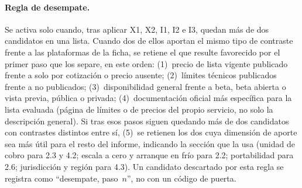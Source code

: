\documentclass[12pt, letterpaper, table, xcdraw]{inf-pucv}
\begin{document}
\FloatBarrier

\paragraph*{Regla de desempate.} Se activa solo cuando, tras aplicar X1, X2, I1, I2 e I3, quedan más de dos candidatos en una lista. Cuando dos de ellos aportan el mismo tipo de contraste frente a las plataformas de la ficha, se retiene el que resulte favorecido por el primer paso que los separe, en este orden: (1)~precio de lista vigente publicado frente a solo por cotización o precio ausente; (2)~límites técnicos publicados frente a no publicados; (3)~disponibilidad general frente a beta, beta abierta o vista previa, pública o privada; (4)~documentación oficial más específica para la lista evaluada (página de límites o de precios del propio servicio, no solo la descripción general). Si tras esos pasos siguen quedando más de dos candidatos con contrastes distintos entre sí, (5)~se retienen los dos cuya dimensión de aporte sea más útil para el resto del informe, indicando la sección que la usa (unidad de cobro para 2.3 y 4.2; escala a cero y arranque en frío para 2.2; portabilidad para 2.6; jurisdicción y región para 4.3). Un candidato descartado por esta regla se registra como ``desempate, paso~$n$'', no con un código de puerta.


\end{document}
